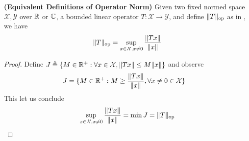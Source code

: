 \documentclass{report}
\begin{document}
\begin{theorem}
\textbf{(Equivalent Definitions of Operator Norm)} Given two fixed normed space $\mathcal{X},\mathcal{Y}$ over $\mathbb{R}$ or  $\mathbb{C}$, a bounded linear operator  $T:\mathcal{X}\rightarrow \mathcal{Y}$, and define $\| T \|_{\text{op}}$ as in , we have 
\begin{align*}
\| T \|_{\text{op}}=\sup_{x\in \mathcal{X},x\neq 0} \frac{\| Tx \|}{\| x \|}
\end{align*}
\end{theorem}
\begin{proof}
Define $J\triangleq \{ M\in\mathbb{R}^+:\forall x \in \mathcal{X},\| Tx \|\leq M\| x \| \}$ and observe 
\begin{align*}
J&=\{ M\in\mathbb{R}^+:M\geq \frac{\| Tx \|}{\| x \|},\forall x\neq 0\in \mathcal{X} \}
\end{align*}
This let us conclude 
\begin{align*}
\sup_{x \in \mathcal{X},x\neq 0} \frac{\| Tx \|}{\| x \|}=\min  J= \| T \|_{\text{op}}
\end{align*}
\end{proof}
\end{document}
